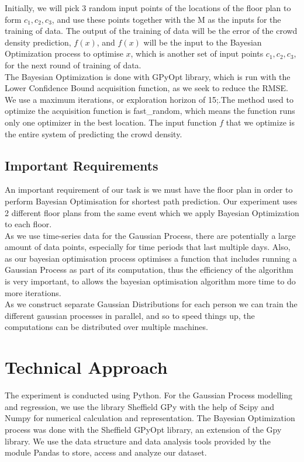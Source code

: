 \documentclass[letterpaper]{article}
\begin{document}
Initially, we will pick 3 random input points of the locations of the floor plan to form $c_1, c_2, c_3$, and use these points together with the M as the inputs for the training of data. The output of the training of data will be the error of the crowd density prediction, $f(x)$, and $f(x)$ will be the input to the Bayesian Optimization process to optimise $x$, which is another set of input points $c_1, c_2, c_3$, for the next round of training of data. \\

The Bayesian Optimization is done with GPyOpt library, which is run with the Lower Confidence Bound acquisition function, as we seek to reduce the RMSE. We use a maximum iterations, or exploration horizon of 15;.The method used to optimize the acquisition function is fast\_random, which means the function runs only one optimizer in the best location. The input function $f$ that we optimize is the entire system of predicting the crowd density.

\subsection{Important Requirements}

An important requirement of our task is we must have the floor plan in order to perform Bayesian Optimisation for shortest path prediction. Our experiment uses 2 different floor plans from the same event which we apply Bayesian Optimization to each floor.\\

As we use time-series data for the Gaussian Process, there are potentially a large amount of data points, especially for time periods that last multiple days. Also, as our bayesian optimisation process optimises a function that includes running a Gaussian Process as part of its computation, thus the efficiency of the algorithm is very important, to allows the bayesian optimisation algorithm more time to do more iterations.\\

As we construct separate Gaussian Distributions for each person we can train the different gaussian processes in parallel, and so to speed things up, the computations can be distributed over multiple machines.


\section{Technical Approach}
The experiment is conducted using Python. For the Gaussian Process modelling and regression, we use the library Sheffield GPy with the help of Scipy and Numpy for numerical calculation and representation. The Bayesian Optimization process was done with the Sheffield GPyOpt library, an extension of the Gpy library. We use the data structure and data analysis tools provided by the module Pandas to store, access and analyze our dataset.
\end{document}
